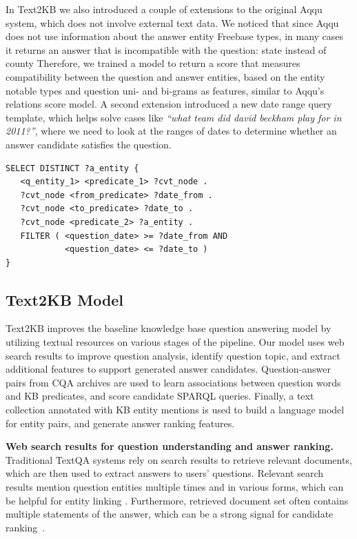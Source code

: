 In Text2KB we also introduced a couple of extensions to the original Aqqu system, which does not involve external text data.
We noticed that since Aqqu does not use information about the answer entity Freebase types, in many cases it returns an answer that is incompatible with the question: \eg state instead of county \etc
Therefore, we trained a model to return a score that measures compatibility between the question and answer entities, based on the entity notable types and question uni- and bi-grams as features, similar to Aqqu's relations score model.
A second extension introduced a new date range query template, which helps solve cases like \textit{``what team did david beckham play for in 2011?''}, where we need to look at the ranges of dates to determine whether an answer candidate satisfies the question.
\\

\begin{minipage}{\linewidth}
\begin{lstlisting}[frame=single,basicstyle=\small]
SELECT DISTINCT ?a_entity {
   <q_entity_1> <predicate_1> ?cvt_node .
   ?cvt_node <from_predicate> ?date_from .
   ?cvt_node <to_predicate> ?date_to .
   ?cvt_node <predicate_2> ?a_entity .
   FILTER ( <question_date> >= ?date_from AND
            <question_date> <= ?date_to )
}
\end{lstlisting}
\end{minipage}


\subsection{Text2KB Model}
\label{section:factoid:text2kb:model}

Text2KB improves the baseline knowledge base question answering model by utilizing textual resources on various stages of the pipeline.
Our model uses web search results to improve question analysis, \ie identify question topic, and extract additional features to support generated answer candidates.
Question-answer pairs from CQA archives are used to learn associations between question words and KB predicates, and score candidate SPARQL queries.
Finally, a text collection annotated with KB entity mentions is used to build a language model for entity pairs, and generate answer ranking features.

\textbf{Web search results for question understanding and answer ranking.}
Traditional TextQA systems rely on search results to retrieve relevant documents, which are then used to extract answers to users' questions.
Relevant search results mention question entities multiple times and in various forms, which can be helpful for entity linking \cite{SMAPH_ERD:2014}.
Furthermore, retrieved document set often contains multiple statements of the answer, which can be a strong signal for candidate ranking~\cite{lin2007exploration}.

